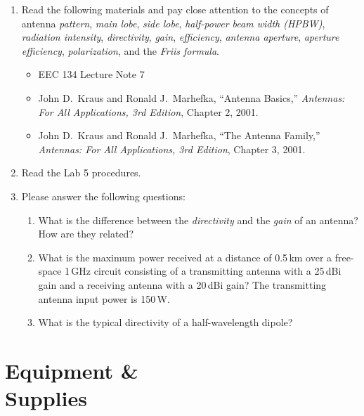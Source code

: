 \documentclass[letterpaper, 11pt]{article}
\begin{document}
\reversemarginpar
{} 
\vspace{-2ex}
\begin{enumerate}
	\item Read the following materials and pay close attention to the concepts of antenna \textit{pattern}, \textit{main lobe}, \textit{side lobe}, \textit{half-power beam width (HPBW)}, \textit{radiation intensity}, \textit{directivity}, \textit{gain}, \textit{efficiency}, \textit{antenna aperture}, \textit{aperture efficiency}, \textit{polarization}, and the \textit{Friis formula}. 
	\begin{itemize}
		\item EEC 134 Lecture Note 7 
		
		\item John D.~Kraus and  Ronald J.~Marhefka, ``Antenna Basics,'' \emph{Antennas: For All Applications, 3rd Edition}, Chapter 2, 2001.
		
		\item John D.~Kraus and  Ronald J.~Marhefka, ``The Antenna Family,'' \emph{Antennas: For All Applications, 3rd Edition}, Chapter 3, 2001.
	\end{itemize}
	\item Read the Lab 5 procedures. 

	\item Please answer the following questions:
		\begin{enumerate}
			\item What is the difference between the \textit{directivity} and the \textit{gain} of an antenna? How are they related?
			
			\item What is the maximum power received at a distance of 0.5\,km over a free-space 1\,GHz circuit consisting of a transmitting antenna with a 25\,dBi gain and a receiving antenna with a 20\,dBi gain? The transmitting antenna input power is 150\,W. 
			
			\item What is the typical directivity of a half-wavelength dipole?
			
		\end{enumerate}

\end{enumerate}

\section{Equipment \& \\Supplies}
\end{document}
